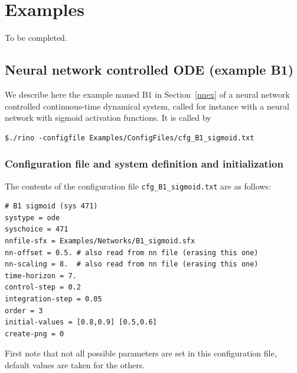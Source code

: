\documentclass{article}
\begin{document}
\section{Examples \label{examples}}

To be completed. 

\subsection{Neural network controlled ODE (example B1)}

We describe here the example named B1 in Section~\ref{nnex} of a neural network controlled continuous-time dynamical system,  called for instance with a neural network with sigmoid activation functions.  
It is called by
\begin{verbatim}
$./rino -configfile Examples/ConfigFiles/cfg_B1_sigmoid.txt
\end{verbatim}

\subsubsection{Configuration file and system definition and initialization}
The contents of the configuration file \texttt{cfg\_B1\_sigmoid.txt} are as follows:
\begin{verbatim}
# B1 sigmoid (sys 471)
systype = ode
syschoice = 471
nnfile-sfx = Examples/Networks/B1_sigmoid.sfx
nn-offset = 0.5. # also read from nn file (erasing this one)
nn-scaling = 8.  # also read from nn file (erasing this one)
time-horizon = 7.
control-step = 0.2
integration-step = 0.05
order = 3
initial-values = [0.8,0.9] [0.5,0.6]
create-png = 0
\end{verbatim}
First note that not all possible parameters are set  in this configuration file,  default values are taken for the others. 
\end{document}
